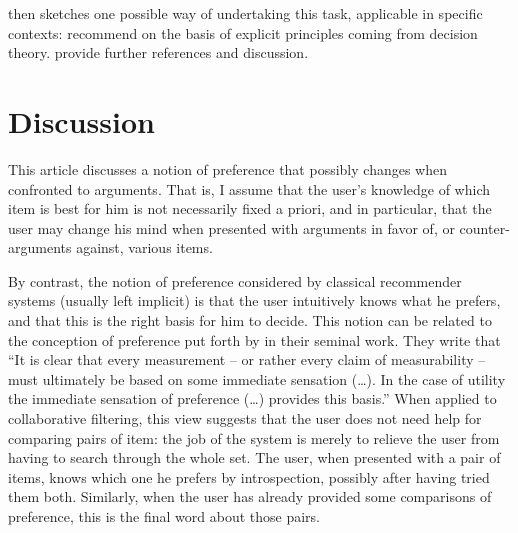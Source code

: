 \documentclass[french, english]{da2pl2018}
\begin{document}
 then sketches one possible way of undertaking this task, applicable in specific contexts: recommend on the basis of explicit principles coming from decision theory.  provide further references and discussion.

\section{Discussion}
\label{sec:disc}
This article discusses a notion of preference that possibly changes when confronted to arguments. That is, I assume that the user’s knowledge of which item is best for him is not necessarily fixed a priori, and in particular, that the user may change his mind when presented with arguments in favor of, or counter-arguments against, various items. 

By contrast, the notion of preference considered by classical recommender systems (usually left implicit) is that the user intuitively knows what he prefers, and that this is the right basis for him to decide. This notion can be related to the conception of preference put forth by \citet[p. 16]{von_neumann_theory_1944} in their seminal work. They write that “It is clear that every measurement – or rather every claim of measurability – must ultimately be based on some immediate sensation (…). In the case of utility the immediate sensation of preference (…) provides this basis.” When applied to collaborative filtering, this view suggests that the user does not need help for comparing pairs of item: the job of the system is merely to relieve the user from having to search through the whole set. 
The user, when presented with a pair of items, knows which one he prefers by introspection, possibly after having tried them both. %
Similarly, when the user has already provided some comparisons of preference, this is the final word about those pairs.
\end{document}

